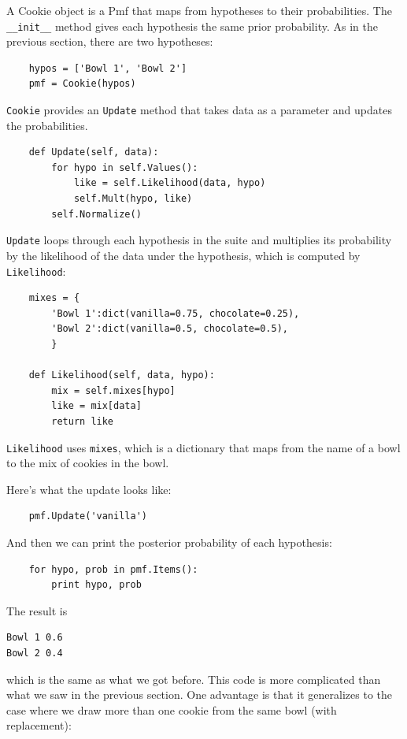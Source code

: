 \documentclass[12pt]{book}
\begin{document}
A Cookie object is a Pmf that maps from hypotheses to their
probabilities.  The \verb"__init__" method gives each hypothesis
the same prior probability.  As in the previous section, there are
two hypotheses:

\begin{verbatim}
    hypos = ['Bowl 1', 'Bowl 2']
    pmf = Cookie(hypos)
\end{verbatim}

\verb"Cookie" provides an \verb"Update" method that takes
data as a parameter and updates the probabilities.

\begin{verbatim}
    def Update(self, data):
        for hypo in self.Values():
            like = self.Likelihood(data, hypo)
            self.Mult(hypo, like)
        self.Normalize()
\end{verbatim}

\verb"Update" loops through each hypothesis in the suite
and multiplies its probability by the likelihood of the
data under the hypothesis, which is computed by \verb"Likelihood":

\begin{verbatim}
    mixes = {
        'Bowl 1':dict(vanilla=0.75, chocolate=0.25),
        'Bowl 2':dict(vanilla=0.5, chocolate=0.5),
        }

    def Likelihood(self, data, hypo):
        mix = self.mixes[hypo]
        like = mix[data]
        return like
\end{verbatim}

\verb"Likelihood" uses \verb"mixes", which is a dictionary
that maps from the name of a bowl to the mix of cookies in
the bowl.

Here's what the update looks like:

\begin{verbatim}
    pmf.Update('vanilla')
\end{verbatim}

And then we can print the posterior probability of each hypothesis:

\begin{verbatim}
    for hypo, prob in pmf.Items():
        print hypo, prob
\end{verbatim}

The result is

\begin{verbatim}
Bowl 1 0.6
Bowl 2 0.4
\end{verbatim}

which is the same as what we got before.  This code is more complicated
than what we saw in the previous section.  One advantage is that it
generalizes to the case where we draw more than one cookie from the
same bowl (with replacement):
\end{document}
